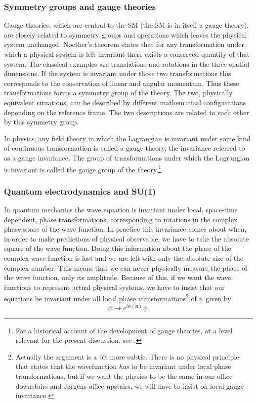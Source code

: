 \subsubsection{Symmetry groups and gauge theories}
Gauge theories, which are central to the SM (the SM is in itself a gauge theory), are closely related to symmetry groups and operations which leaves the physical system unchanged. Noether's theorem \cite{noether1971ivp} states that for any transformation under which a physical system is left invariant there exists a conserved quantity of that system. The classical examples are translations and rotations in the three spatial dimensions. If the system is invariant under those two transformations this corresponds to the conservation of linear and angular momentum. Thus these transformations forms a symmetry group of the theory. The two, physically equivalent situations, can be described by different mathematical configurations depending on the reference frame. The two descriptions are related to each other by this symmetry group.

In physics, any field theory in which the Lagrangian is invariant under some kind of continuous transformation is called a gauge theory, the invariance referred to as a gauge invariance. The group of transformations under which the Lagrangian is invariant is called the gauge group of the theory.\footnote{For a historical account of the development of gauge theories, at a level relevant for the present discussion, see \cite{gross1992gtp}.}

\subsubsection{Quantum electrodynamics and SU(1)}
In quantum mechanics the wave equation is invariant under local, space-time dependent, phase transformations, corresponding to rotations in the complex phase space of the wave function. In practice this invariance comes about when, in order to make predictions of physical observable, we have to take the absolute square of the wave function. Doing this information about the phase of the complex wave function is lost and we are left with only the absolute size of the complex number. This means that we can never physically measure the phase of the wave function, only its amplitude. Because of this, if we want the wave functions to represent actual physical systems, we have to insist that our equations be invariant under all local phase transformations\footnote{Actually the argument is a bit more subtle. There is no physical principle that states that the wavefunction \emph{has} to be invariant under local phase transformations, but if we want the physics to be the same in our office downstairs and Jørgens office upstairs, we will have to insist on local gauge invariance.} of $\psi$ given by
\begin{equation} \label{eq:localphase}
    \psi \rightarrow e^{i\alpha(\mathbf{x})} \psi.
\end{equation}

